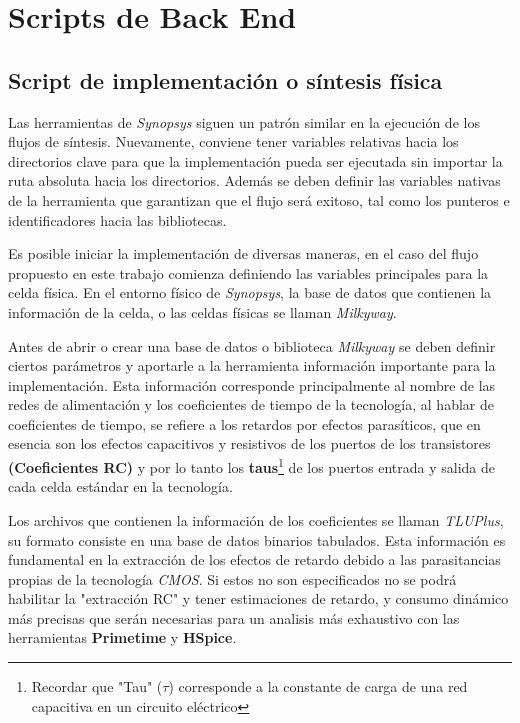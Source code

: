 \section{Scripts de Back End}

\subsection{Script de implementación o síntesis física}
Las herramientas de \textit{Synopsys} siguen un patrón similar en la ejecución de los flujos de síntesis. Nuevamente, conviene tener variables relativas hacia los directorios clave para que la implementación pueda ser ejecutada sin importar la ruta absoluta hacia los directorios. Además se deben definir las variables nativas de la herramienta que garantizan que el flujo será exitoso, tal como los punteros e identificadores hacia las bibliotecas.

Es posible iniciar la implementación de diversas maneras, en el caso del flujo propuesto en este trabajo comienza definiendo las variables principales para la celda física. En el entorno físico de \textit{Synopsys}, la base de datos que contienen la información de la celda, o las celdas físicas se llaman \textit{Milkyway}.

Antes de abrir o crear una base de datos o biblioteca \textit{Milkyway} se deben definir ciertos parámetros y aportarle a la herramienta información importante para la implementación. Esta información corresponde principalmente al nombre de las redes de alimentación y los coeficientes de tiempo de la tecnología, al hablar de coeficientes de tiempo, se refiere a los retardos por efectos parasíticos, que en esencia son los efectos capacitivos y resistivos de los puertos de los transistores \textbf{(Coeficientes RC)} y por lo tanto los \textbf{taus}\footnote{Recordar que "Tau" ($\tau$) corresponde a la constante de carga de una red capacitiva en un circuito eléctrico} de los puertos entrada y salida de cada celda estándar en la tecnología.

Los archivos que contienen la información de los coeficientes se llaman \textit{TLUPlus}, su formato consiste en una base de datos binarios tabulados. Esta información es fundamental en la extracción de los efectos de retardo debido a las parasitancias propias de la tecnología \textit{CMOS}. Si estos no son especificados no se podrá habilitar la "extracción RC" y tener estimaciones de retardo, y consumo dinámico más precisas que serán necesarias para un analisis más exhaustivo con las herramientas \textbf{Primetime} y \textbf{HSpice}.


